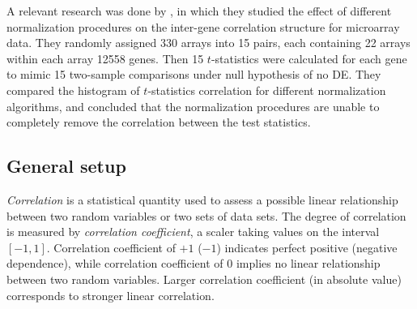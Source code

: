 	
	A relevant research was done by \citet{qiu2005effects}, in which they studied the effect of 
	different
	normalization procedures on the inter-gene correlation structure for microarray data. They 
	randomly
	assigned 330 arrays into 15 pairs, each containing 22 arrays within each array 12558 genes. 
	Then 15
	$t$-statistics were calculated for each gene to mimic 15 two-sample comparisons under null
	hypothesis of no DE. They compared the histogram of $t$-statistics correlation for different
	normalization algorithms, and concluded that the normalization procedures are unable to 
	completely
	remove the correlation between the test statistics. %
	
	
	
	\subsection{General setup}\label{subsec:generalsetup}
	\textit{Correlation} is a statistical quantity used to assess a possible linear relationship 
	between two random variables or two sets of data sets. The degree of correlation is measured by 
	\textit{correlation coefficient}, a scaler taking values on the interval $[-1, 1]$. Correlation 
	coefficient of $+1$ ($-1$) indicates perfect positive (negative dependence), while correlation 
	coefficient of 0 implies no linear relationship between two random variables. Larger 
	correlation coefficient (in absolute value) corresponds to stronger linear correlation. 
		
